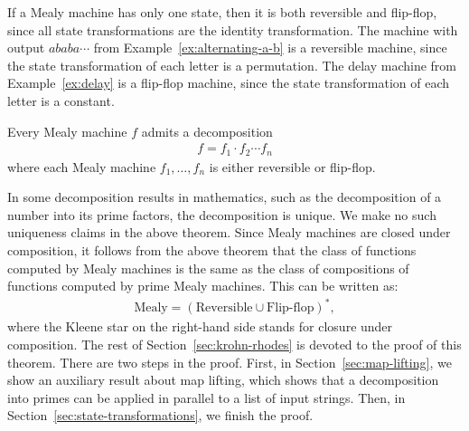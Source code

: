 \begin{myexample}
If a Mealy machine has only one state, then it is  both reversible and flip-flop, since all state transformations are the identity transformation. 
    The machine with output $ababa\cdots$ from Example~\ref{ex:alternating-a-b} is a reversible machine, since the state transformation of each letter is a permutation. 
    The delay machine from Example~\ref{ex:delay} is a flip-flop machine, since the state transformation of each letter is a constant. 
\end{myexample}


\begin{theorem} 
\label{thm:krohn-rhodes}
    Every Mealy machine $f$ admits a  decomposition
    \begin{align*}
    f = f_1 \cdot f_2  \cdots f_n
    \end{align*}
    where each  Mealy machine $f_1,\ldots,f_n$ is either reversible or flip-flop.
\end{theorem}

In some decomposition results in mathematics, such as the decomposition of a number into its prime factors, the decomposition is unique. We make no such uniqueness claims in the above theorem. 
Since Mealy machines are closed under composition, it follows from the above theorem that the class of functions computed by Mealy machines is the same as the class of compositions of  functions computed by prime Mealy machines. This can be written as: 
\begin{align*}
\text{Mealy} = (\text{Reversible} \cup \text{Flip-flop})^*,
\end{align*}
where the Kleene star on the right-hand side stands for closure under composition.
The rest of Section~\ref{sec:krohn-rhodes} is devoted to the proof of this theorem. There are two steps in the proof. First, in Section~\ref{sec:map-lifting}, we show an auxiliary result about map lifting, which shows that a decomposition into primes can be applied in parallel to a list of input strings. Then, in Section~\ref{sec:state-transformations}, we finish the proof.


